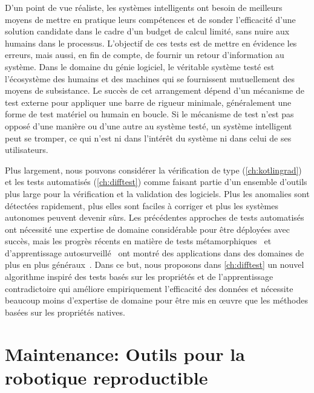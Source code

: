 D'un point de vue réaliste, les systèmes intelligents ont besoin de meilleurs moyens de mettre en pratique leurs compétences et de sonder l'efficacité d'une solution candidate dans le cadre d'un budget de calcul limité, sans nuire aux humains dans le processus. L'objectif de ces tests est de mettre en évidence les erreurs, mais aussi, en fin de compte, de fournir un retour d'information au système. Dans le domaine du génie logiciel, le véritable système testé est l'écosystème des humains et des machines qui se fournissent mutuellement des moyens de subsistance. Le succès de cet arrangement dépend d'un mécanisme de test externe pour appliquer une barre de rigueur minimale, généralement une forme de test matériel ou humain en boucle. Si le mécanisme de test n'est pas opposé d'une manière ou d'une autre au système testé, un système intelligent peut se tromper, ce qui n'est ni dans l'intérêt du système ni dans celui de ses utilisateurs.

Plus largement, nous pouvons considérer la vérification de type (\autoref{ch:kotlingrad}) et les tests automatisés (\autoref{ch:difftest}) comme faisant partie d'un ensemble d'outils plus large pour la vérification et la validation des logiciels. Plus les anomalies sont détectées rapidement, plus elles sont faciles à corriger et plus les systèmes autonomes peuvent devenir sûrs. Les précédentes approches de tests automatisés ont nécessité une expertise de domaine considérable pour être déployées avec succès, mais les progrès récents en matière de tests métamorphiques~\citep{chen1998metamorphic} et d'apprentissage autosurveillé~\citep{lieb2005adaptive} ont montré des applications dans des domaines de plus en plus généraux~\citep{zhang2020testing}. Dans ce but, nous proposons dans \autoref{ch:difftest} un nouvel algorithme inspiré des tests basés sur les propriétés et de l'apprentissage contradictoire qui améliore empiriquement l'efficacité des données et nécessite beaucoup moins d'expertise de domaine pour être mis en œuvre que les méthodes basées sur les propriétés natives.

\section{Maintenance: Outils pour la robotique reproductible}

